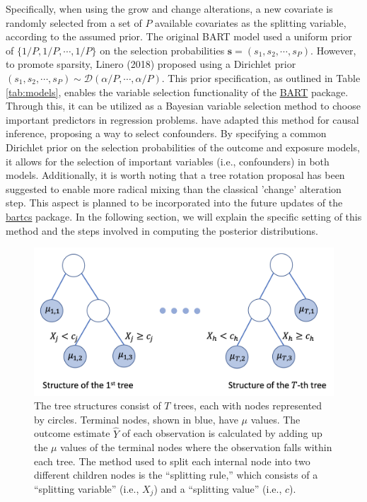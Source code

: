Specifically, when using the grow and change alterations, a new covariate is randomly selected from a set of $P$ available covariates as the splitting variable, according to the assumed prior. The original BART model used a uniform prior of $\{1/P, 1/P, \cdots, 1/P\}$ on the selection probabilities $\boldsymbol{s} = (s_1, s_2, \cdots, s_P)$. However, to promote sparsity, Linero (2018) proposed using a Dirichlet prior $ (s_1, s_2, \cdots, s_P) \sim \mathcal{D}(\alpha/P, \cdots, \alpha/P)$. This prior specification, as outlined in Table \ref{tab:models}, enables the variable selection functionality of the \href{https://cran.r-project.org/package=BART}{BART} package. Through this, it can be utilized as a Bayesian variable selection method to choose important predictors in regression problems. \cite{kim2023bnp} have adapted this method for causal inference, proposing a way to select confounders. By specifying a common Dirichlet prior on the selection probabilities of the outcome and exposure models, it allows for the selection of important variables (i.e., confounders) in both models. Additionally, it is worth noting that a tree rotation proposal \citep{pratola2016efficient} has been suggested to enable more radical mixing than the classical 'change' alteration step. This aspect is planned to be incorporated into the future updates of the \href{https://CRAN.R-project.org/package=bartcs}{bartcs} package. In the following section, we will explain the specific setting of this method and the steps involved in computing the posterior distributions.

\begin{figure}[htbp]
\centering
\includegraphics[width=0.6\linewidth]{fig/fig1.png}
\caption{The tree structures consist of $T$ trees, each with nodes represented by circles. Terminal nodes, shown in blue, have $\mu$ values. The outcome estimate $\hat{Y}$ of each observation is calculated by adding up the $\mu$ values of the terminal nodes where the observation falls within each tree. The method used to split each internal node into two different children nodes is the ``splitting rule,'' which consists of a ``splitting variable'' (i.e., $X_j$) and a ``splitting value'' (i.e., $c$).
}\label{fig:bart}
\end{figure}



